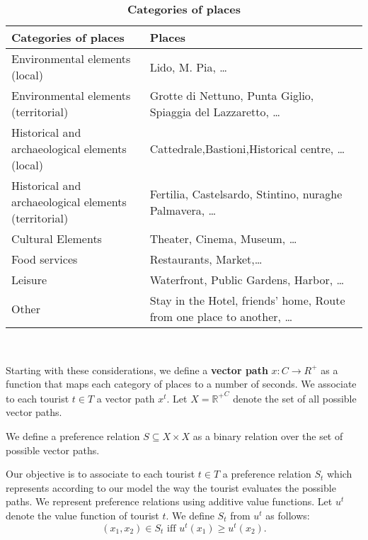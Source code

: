 \documentclass[a4paper]{article}
\begin{document}
\begin{table}[h]
\begin{tabular}{ll}
\hline
\textbf{Categories of places}&\textbf{Places}\\
\hline
\parbox{5cm}{Environmental elements (local)}&\parbox{6cm}{Lido, M. Pia, \dots}\\
\parbox{5cm}{Environmental elements (territorial)}&\parbox{6cm}{Grotte di Nettuno, Punta Giglio, Spiaggia del Lazzaretto, \dots}\\
\parbox{5cm}{Historical and archaeological elements (local)}&\parbox{6cm}{Cattedrale,Bastioni,Historical centre, \dots}\\
\parbox{5cm}{Historical and archaeological elements (territorial)}&\parbox{6cm}{Fertilia, Castelsardo, Stintino, nuraghe Palmavera, \dots}\\
\parbox{5cm}{Cultural Elements}&\parbox{6cm}{Theater, Cinema, Museum, \dots}\\
\parbox{5cm}{Food services}&\parbox{6cm}{Restaurants, Market,\dots}\\
\parbox{5cm}{Leisure}&\parbox{6cm}{Waterfront, Public Gardens, Harbor, \dots}\\
\parbox{5cm}{Other}&\parbox{6cm}{Stay in the Hotel, friends' home, Route from one place to another, \dots}\\
\hline
\end{tabular}

\caption{\textbf{Categories of places}}\
\label{Table}
\end{table}

Starting with these considerations, we define a \textbf{vector path} $x: C \rightarrow R^+$ as a function that maps each category of places to a number of seconds.
We associate to each tourist $t \in T $ a vector path $x^t$.
Let $X={\mathbb{R}^+}^C$ denote the set of all possible vector paths.

We define a preference relation $S \subseteq X \times X $ as a binary relation over the set of possible vector paths.

Our objective is to associate to each tourist $t \in T$ a preference relation $S_t$ which represents according to our model the way the tourist evaluates the possible paths.
We represent preference relations using additive value functions. Let $u^t$ denote the value function of tourist $t$. We define $S_t$ from  $u^t$ as follows:
\begin{equation}
(x_1,x_2) \in S_t \text { iff } u^t(x_1) \geq u^t(x_2).
\end{equation}
\end{document}
